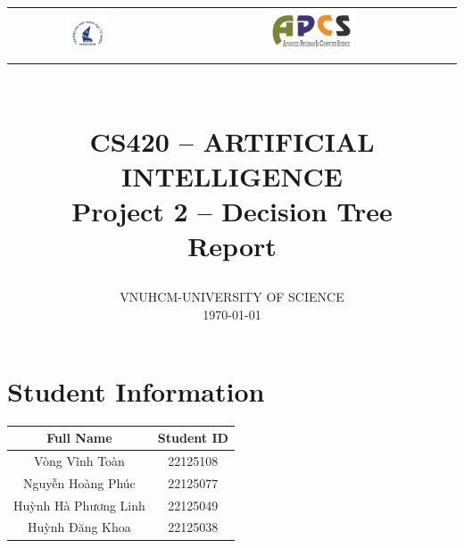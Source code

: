 \documentclass{article}
\title{ \normalsize \textsc{}
		\\ [2.0cm]
        \begin{tabular}{c@{\hskip 2cm}c}
            \includegraphics[width=0.3\textwidth]{styles/logoHCMUS.png}
            &
            \includegraphics[width=0.3\textwidth]{styles/logoAPCS.png}
        \end{tabular}
        \vspace{2em} \\
        \vspace{6pt}
        \LARGE \textbf{\uppercase{CS420 -- Artificial Intelligence}} \\
		\LARGE \textbf{Project 2 -- Decision Tree} \\
        \Large \textbf{Report} \\
        \vspace*{13\baselineskip}
}
\author{
    VNUHCM-UNIVERSITY OF SCIENCE \\
    \today
}
\date{}
\begin{document}
\maketitle
\thispagestyle{empty}
\newpage

\thispagestyle{empty}
\section*{Student Information}
\begin{table}[h]
    \centering
    \begin{tabular}{|c|c|}
        \hline
        \textbf{Full Name} & \textbf{Student ID} \\ \hline 
        Vòng Vĩnh Toàn & 22125108 \\ \hline
        Nguyễn Hoàng Phúc & 22125077\\ \hline
        Huỳnh Hà Phương Linh & 22125049\\ \hline
        Huỳnh Đăng Khoa & 22125038 \\ 
        \hline
    \end{tabular}
\end{table}
\newpage

\tableofcontents
\thispagestyle{empty}
\newpage

\setcounter{page}{1}







\newpage
{}

\end{document}
